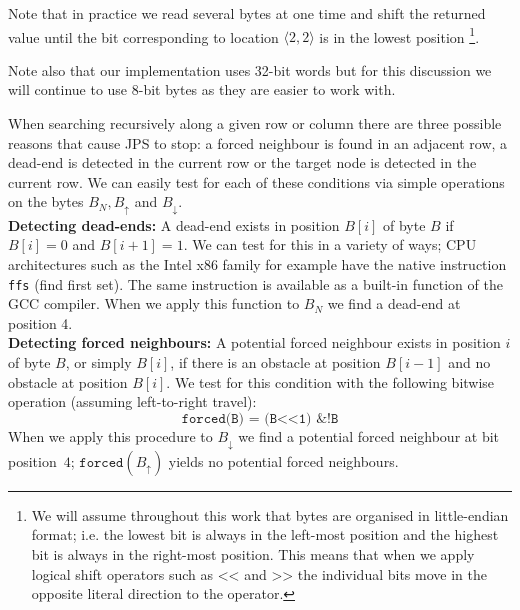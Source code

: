 \noindent 
Note that in practice we read several bytes at one time and shift the returned
value until the bit corresponding to location $\langle 2, 2\rangle$ is in the
lowest position \footnote{We will assume throughout this work that bytes are
organised in little-endian format; i.e. the lowest bit is always in the
left-most position and the highest bit is always in the right-most position. 
This means that when we apply logical shift operators such as $\texttt{<<}$
and $\texttt{>>}$ 
the individual bits move in the opposite literal direction to the operator.}.

Note also that our implementation uses 32-bit words but for this discussion
we will continue to use 8-bit bytes as they are easier to work with.  


When searching recursively along a given row or column
there are three possible reasons that cause JPS to stop: 
a forced neighbour is found in an adjacent row, a dead-end is 
detected in the current row or the target node is detected in the
current row.
We can easily test for each of these conditions via simple
operations on the bytes $B_{N}, B_{\uparrow}$ and $B_{\downarrow}$.
\\ \noindent
\textbf{Detecting dead-ends:}
A dead-end exists in position $B[i]$ of byte $B$ if $B[i] = 0$ and 
$B[i+1] = 1$. We can test for this in a variety of ways;
CPU architectures such as the Intel x86 family for example have the native 
instruction \texttt{ffs} (find first set). The same instruction is available as
a built-in function of the \textsc{GCC} compiler. When we apply
this function to $B_{N}$ we find a dead-end at position 4.
\\ \noindent
\textbf{Detecting forced neighbours:}
A potential forced neighbour exists in position $i$ of byte $B$, or simply 
$B[i]$, if there is an obstacle at position $B[i-1]$ 
and no obstacle at position $B[i]$. We test for this condition with the
following bitwise operation (assuming left-to-right travel):
\begin{equation}
\texttt{forced(B) = (B<<1)\ \& !B}
\end{equation}
When we apply this procedure to $B_{\downarrow}$ we find a potential forced
neighbour at bit position~$4$; $\texttt{forced}(B_{\uparrow})$ yields no potential 
forced neighbours.

